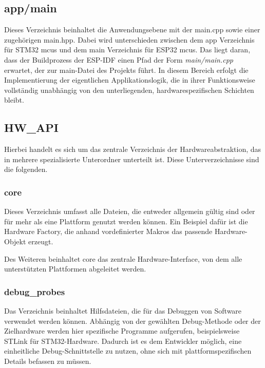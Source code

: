\subsection*{app/main}
Dieses Verzeichnis beinhaltet die Anwendungsebene mit der main.cpp sowie einer zugehörigen main.hpp. 
Dabei wird unterschieden zwischen dem app Verzeichnis für STM32 \gls{mcu}s und dem main Verzeichnis für ESP32 \gls{mcu}s.
Das liegt daran, dass der Buildprozess der ESP-IDF einen Pfad der Form \textit{main/main.cpp} erwartet, der zur main-Datei des Projekts führt.
In diesem Bereich erfolgt die Implementierung der eigentlichen Applikationslogik, die in ihrer Funktionsweise vollständig unabhängig von den unterliegenden, hardwarespezifischen Schichten bleibt.

\subsection*{HW\_API}
Hierbei handelt es sich um das zentrale Verzeichnis der Hardwareabstraktion, das in mehrere spezialisierte Unterordner unterteilt ist.
Diese Unterverzeichnisse sind die folgenden.

\subsubsection*{core}
Dieses Verzeichnis umfasst alle Dateien, die entweder allgemein gültig sind oder für mehr als eine Plattform genutzt werden können. 
Ein Beispiel dafür ist die Hardware Factory, die anhand vordefinierter Makros das passende Hardware-Objekt erzeugt.

Des Weiteren beinhaltet core das zentrale Hardware-Interface, von dem alle unterstützten Plattformen abgeleitet werden.

\subsubsection*{debug\_probes}
Das Verzeichnis beinhaltet Hilfsdateien, die für das Debuggen von Software verwendet werden können.
Abhängig von der gewählten Debug-Methode oder der Zielhardware werden hier spezifische Programme aufgerufen, beispielsweise STLink für STM32-Hardware.
Dadurch ist es dem Entwickler möglich, eine einheitliche Debug-Schnittstelle zu nutzen, ohne sich mit plattformspezifischen Details befassen zu müssen.

